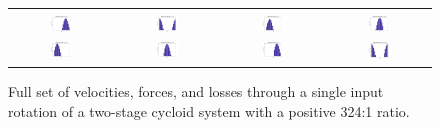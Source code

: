 \begin{figure}[h]
\begin{tabular}{cccc}
	   \\
	   \hline
	   \\
	   \includegraphics[width=0.23\textwidth]{fig/double_1_losses_0} &
	   \includegraphics[width=0.23\textwidth]{fig/double_1_losses_pi_2} &
	   \includegraphics[width=0.23\textwidth]{fig/double_1_losses_pi} &
	   \includegraphics[width=0.23\textwidth]{fig/double_1_losses_3pi_2} \\
	   \includegraphics[width=0.23\textwidth]{fig/double_2_losses_0} &
	   \includegraphics[width=0.23\textwidth]{fig/double_2_losses_pi_2} &
	   \includegraphics[width=0.23\textwidth]{fig/double_2_losses_pi} &
	   \includegraphics[width=0.25\textwidth]{fig/double_2_losses_3pi_2} \\
   \end{tabular}
   \caption{Full set of velocities, forces, and losses through a single input rotation of a two-stage cycloid system with a positive 324:1 ratio.}
   \label{fig:two_stage_forces}
\end{figure}

